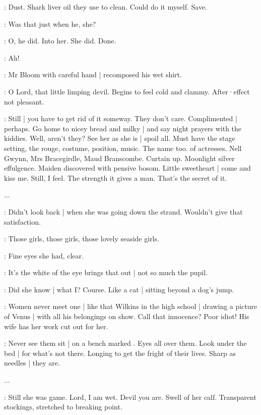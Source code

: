 \BloomAbstract:
Dust.
Shark liver oil
they use to clean.
Could do it myself.
Save.

\BloomToday:
Was that just when he,
she?

\BloomToday:
O,
he did.
Into her.
She did.
Done.

\BloomInt:
Ah!%

:
Mr Bloom with careful hand |
recomposed his wet shirt.

\BloomCurrent:
O Lord,
that little limping devil.
Begins to feel cold and clammy.
After·effect not pleasant.

\BloomAbstract:
Still |
you have to get rid of it someway.
They don't care.
Complimented |
perhaps.
Go home to nicey bread and milky |
and say night prayers with the kiddies.
Well,
aren't they?
See her as she is |
spoil all.
Must have the stage setting,
the rouge,
costume,
position,
music.
The name too.
 of actresses.
Nell Gwynn,
Mrs Bracegirdle,
Maud Branscombe.
Curtain up.
Moonlight silver effulgence.
Maiden discovered with pensive bosom.
Little sweetheart |
come and kiss me.
Still,
I feel.
The strength it gives a man.
That's the secret of it.%

...

\BloomCurrent:
Didn't look back |
when she was going down the strand.
Wouldn't give that satisfaction.

\BloomHist:
Those girls,
those girls,
those lovely seaside girls.

\BloomCurrent:
Fine eyes she had,
clear.

\BloomAbstract:
It's the white of the eye brings that out |
not so much the pupil.

\BloomCurrent:
Did she know |
what I?
Course.
Like a cat |
sitting beyond a dog's jump.

\BloomHist:
Women never meet one |
like that Wilkins in the high school |
drawing a picture of Venus |
with all his belongings on show.%
Call that innocence?
Poor idiot!
His wife has her work cut out for her.

\BloomAbstract:
Never see them sit |
on a bench marked .
Eyes all over them.
Look under the bed |
for what's not there.
Longing to get the fright of their lives.
Sharp as needles |
they are.

...

\BloomCurrent:
Still she was game.
Lord,
I am wet.
Devil you are.
Swell of her calf.
Transparent stockings,
stretched to breaking point.%

